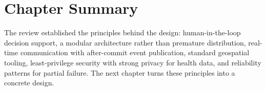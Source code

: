 \section{Chapter Summary}

The review established the principles behind the design: human-in-the-loop decision support, a modular
architecture rather than premature distribution, real-time communication with after-commit event publication,
standard geospatial tooling, least-privilege security with strong privacy for health data, and reliability
patterns for partial failure. The next chapter turns these principles into a concrete design.
